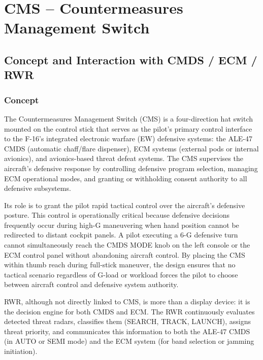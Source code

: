\documentclass[11pt,a4paper]{article}
\begin{document}
\section{CMS -- Countermeasures Management Switch}\label{sec:C5}

\subsection{Concept and Interaction with CMDS / ECM / RWR}\label{sec:C5-S1}

\subsubsection{Concept}\label{sec:C5-S1-S1}

The Countermeasures Management Switch (CMS) is a four-direction hat switch mounted on the control stick that serves as the pilot's primary control interface to the F-16's integrated electronic warfare (EW) defensive systems: the ALE-47 CMDS (automatic chaff/flare dispenser), ECM systems (external pods or internal avionics), and avionics-based threat defeat systems. The CMS supervises the aircraft's defensive response by controlling defensive program selection, managing ECM operational modes, and granting or withholding consent authority to all defensive subsystems.

Its role is to grant the pilot rapid tactical control over the aircraft's defensive posture. This control is operationally critical because defensive decisions frequently occur during high-G maneuvering when hand position cannot be redirected to distant cockpit panels. A pilot executing a 6-G defensive turn cannot simultaneously reach the CMDS MODE knob on the left console or the ECM control panel without abandoning aircraft control. By placing the CMS within thumb reach during full-stick maneuver, the design ensures that no tactical scenario regardless of G-load or workload forces the pilot to choose between aircraft control and defensive system authority.

RWR, although not directly linked to CMS, is more than a display device: it is the decision engine for both CMDS and ECM. The RWR continuously evaluates detected threat radars, classifies them (SEARCH, TRACK, LAUNCH), assigns threat priority, and communicates this information to both the ALE-47 CMDS (in AUTO or SEMI mode) and the ECM system (for band selection or jamming initiation).
\end{document}
